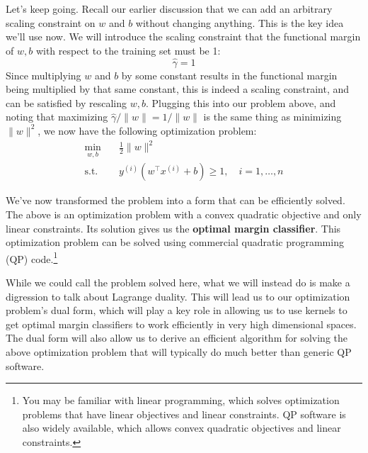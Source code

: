 Let's keep going. Recall our earlier discussion that we can add an arbitrary
scaling constraint on $w$ and $b$ without changing anything. This is the
key idea we'll use now. We will introduce the scaling constraint that the
functional margin of $w,b$ with respect to the training set must be 1:
\begin{equation*}
    \hat{\gamma} = 1 %
\end{equation*}
Since multiplying $w$ and $b$ by some constant results in the functional margin
being multiplied by that same constant, this is indeed a scaling constraint,
and can be satisfied by rescaling $w,b$. Plugging this into our problem above,
and noting that maximizing $\hat{\gamma}/\lVert w \rVert = 1/\lVert w \rVert$ is the same thing as minimizing
$\lVert w \rVert^2$, we now have the following optimization problem:
\begin{align*} %
    \min_{w,b} \quad& \frac{1}{2} \lVert w \rVert^2\\
    \operatorname{s.t.} \quad& y^{(i)} (w^\top x^{(i)} + b) \ge 1, \quad i = 1,\ldots ,n
\end{align*}

We've now transformed the problem into a form that can be efficiently
solved. The above is an optimization problem with a convex quadratic objective
and only linear constraints. Its solution gives us the \textbf{optimal margin
classifier}. This optimization problem can be solved using commercial
quadratic programming (QP) code.\footnote{
You may be familiar with linear programming, which solves optimization problems
that have linear objectives and linear constraints. QP software is also widely available,
which allows convex quadratic objectives and linear constraints.}

While we could call the problem solved here, what we will instead do is
make a digression to talk about Lagrange duality. This will lead us to our
optimization problem's dual form, which will play a key role in allowing us to
use kernels to get optimal margin classifiers to work efficiently in very high
dimensional spaces. The dual form will also allow us to derive an efficient
algorithm for solving the above optimization problem that will typically do
much better than generic QP software.

